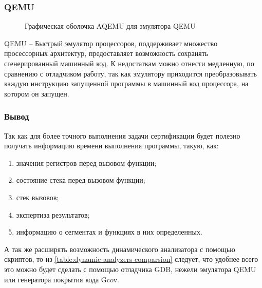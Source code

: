 \subsubsection{QEMU}\label{sec:ch1/sec3/sub2/sub3}
\begin{figure}[!htbp]
    \caption{Графическая оболочка AQEMU для эмулятора QEMU\label{fig:aqemu}}
\end{figure}
QEMU -- Быстрый эмулятор процессоров, поддерживает множество просессорных архитектур,
предоставляет возможность сохранять сгенерированный машинный код.
К недостаткам можно отнести медленную, по сравнению с отладчиком работу,
так как эмулятору приходится преобразовывать каждую инструкцию запущенной программы
в машинный код процессора, на котором он запущен.

\subsubsection{Вывод}\label{sec:ch1/sec3/sub2/sub4}
Так как для более точного выполнения задачи сертификации будет полезно получать
информацию времени выполнения программы, такую, как:
\begin{enumerate}[label={\arabic*)}]
    \item значения регистров перед вызовом функции;
    \item состояние стека перед вызовом функции;
    \item стек вызовов;
    \item экспертиза результатов;
    \item информацию о сегментах и функциях в них определенных.
\end{enumerate}
А так же расширять возможность динамического анализатора с помощью скриптов,
то из \autoref{table:dynamic-analyzers-comparsion} следует, что
удобнее всего это можно будет сделать с помощью отладчика GDB,
нежели эмулятора QEMU или генератора покрытия кода Gcov.


